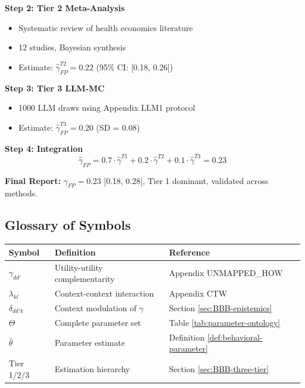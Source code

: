 \textbf{Step 2: Tier 2 Meta-Analysis}
\begin{itemize}[nosep]
    \item Systematic review of health economics literature
    \item 12 studies, Bayesian synthesis
    \item Estimate: $\hat{\gamma}_{FP}^{T2} = 0.22$ (95\% CI: [0.18, 0.26])
\end{itemize}

\textbf{Step 3: Tier 3 LLM-MC}
\begin{itemize}[nosep]
    \item 1000 LLM draws using Appendix LLM1 protocol
    \item Estimate: $\hat{\gamma}_{FP}^{T3} = 0.20$ (SD = 0.08)
\end{itemize}

\textbf{Step 4: Integration}
\begin{equation}
\hat{\gamma}_{FP} = 0.7 \cdot \hat{\gamma}^{T1} + 0.2 \cdot \hat{\gamma}^{T2} + 0.1 \cdot \hat{\gamma}^{T3} = 0.23
\end{equation}

\textbf{Final Report:}
$\gamma_{FP} = 0.23$ [0.18, 0.28], Tier 1 dominant, validated across methods.


\subsection{Glossary of Symbols}
\label{sec:BBB-glossary}

\begin{center}
\renewcommand{\arraystretch}{1.3}
\begin{tabular}{@{}lll@{}}
\toprule
\textbf{Symbol} & \textbf{Definition} & \textbf{Reference} \\
\midrule
$\gamma_{dd'}$ & Utility-utility complementarity & Appendix UNMAPPED_HOW \\
$\lambda_{kl}$ & Context-context interaction & Appendix CTW \\
$\delta_{dd'k}$ & Context modulation of $\gamma$ & Section \ref{sec:BBB-epistemics} \\
$\Theta$ & Complete parameter set & Table \ref{tab:parameter-ontology} \\
$\hat{\theta}$ & Parameter estimate & Definition \ref{def:behavioral-parameter} \\
Tier 1/2/3 & Estimation hierarchy & Section \ref{sec:BBB-three-tier} \\
\bottomrule
\end{tabular}
\end{center}

